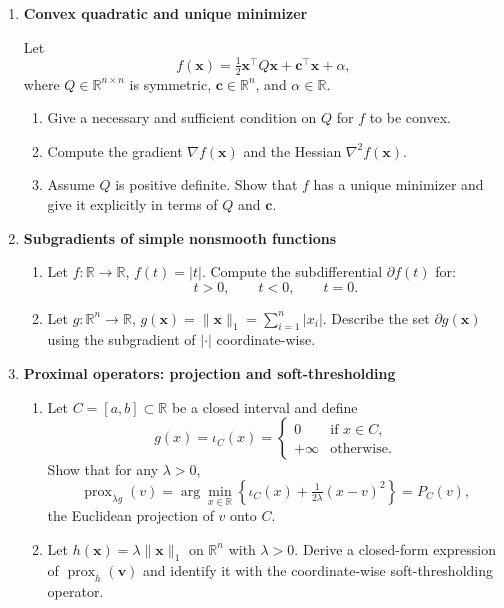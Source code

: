 \documentclass[11pt]{article}
\begin{document}
\begin{enumerate}

\item \textbf{Convex quadratic and unique minimizer}

Let
\[
f(\bm{x}) = \tfrac{1}{2}\bm{x}^\top Q \bm{x} + \bm{c}^\top \bm{x} + \alpha,
\]
where $Q \in \mathbb{R}^{n\times n}$ is symmetric, $\bm{c}\in\mathbb{R}^n$, and $\alpha\in\mathbb{R}$.

\begin{enumerate}
\item Give a necessary and sufficient condition on $Q$ for $f$ to be convex.
\item Compute the gradient $\nabla f(\bm{x})$ and the Hessian $\nabla^2 f(\bm{x})$.
\item Assume $Q$ is positive definite. Show that $f$ has a unique minimizer and give it explicitly in terms of $Q$ and $\bm{c}$.
\end{enumerate}

\bigskip
\item \textbf{Subgradients of simple nonsmooth functions}

\begin{enumerate}
\item Let $f:\mathbb{R}\to\mathbb{R}$, $f(t)=|t|$. Compute the subdifferential $\partial f(t)$ for:
\[
t>0,\qquad t<0,\qquad t=0.
\]
\item Let $g:\mathbb{R}^n\to\mathbb{R}$, $g(\bm{x})=\|\bm{x}\|_1 = \sum_{i=1}^n |x_i|$.
Describe the set $\partial g(\bm{x})$ using the subgradient of $|\cdot|$ coordinate-wise.
\end{enumerate}

\bigskip
\item \textbf{Proximal operators: projection and soft-thresholding}

\begin{enumerate}
\item Let $C=[a,b]\subset\mathbb{R}$ be a closed interval and define
\[
g(x) = \iota_C(x) =
\begin{cases}
0 & \text{if } x\in C,\\
+\infty & \text{otherwise}.
\end{cases}
\]
Show that for any $\lambda>0$,
\[
\operatorname{prox}_{\lambda g}(v)
=
\arg\min_{x\in\mathbb{R}}
\left\{ \iota_C(x) + \tfrac{1}{2\lambda} (x-v)^2 \right\}
=
P_C(v),
\]
the Euclidean projection of $v$ onto $C$.
\item Let $h(\bm{x})=\lambda\|\bm{x}\|_1$ on $\mathbb{R}^n$ with $\lambda>0$.
Derive a closed-form expression of $\operatorname{prox}_{h}(\bm{v})$ and identify it with the coordinate-wise soft-thresholding operator.
\end{enumerate}


\end{enumerate}
\end{document}
